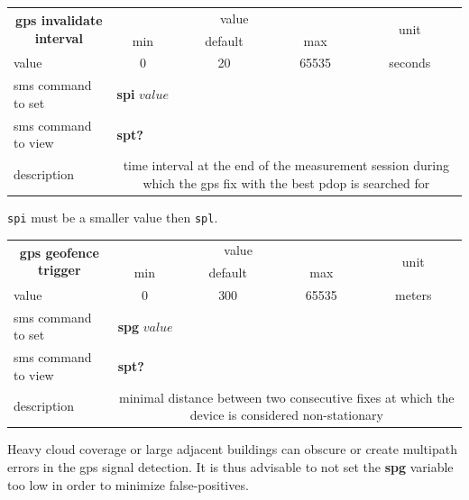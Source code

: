 \documentclass[a4paper,twoside]{refart}
\begin{document}
\label{sms:spi}
\begin{tabular}{ |l|c|c|c|c| }
    \hline
    \multicolumn{1}{|c|}{\multirow{2}{*}{\textbf{gps invalidate interval}}} & \multicolumn{3}{|c|}{value} & \multicolumn{1}{|c|}{\multirow{2}{*}{unit}} \\ \cline{2-4}
    \multicolumn{1}{|c|}{} & min & default & max & \\ \hline
    value & 0 & 20 & 65535 & seconds \\ \hline
    sms command to set & \multicolumn{4}{|l|}{\textbf{spi} $value$} \\ \hline
    sms command to view & \multicolumn{4}{|l|}{\textbf{spt?}} \\ \hline
    description & \multicolumn{4}{|p{6.8cm}|}{time interval at the end of the measurement session during which the gps fix with the best \gls{pdop} is searched for} \\ \hline
\end{tabular}

\verb"spi" must be a smaller value then \verb"spl".

\label{sms:spg}
\begin{tabular}{ |l|c|c|c|c| }
    \hline
    \multicolumn{1}{|c|}{\multirow{2}{*}{\textbf{gps geofence trigger}}} & \multicolumn{3}{|c|}{value} & \multicolumn{1}{|c|}{\multirow{2}{*}{unit}} \\ \cline{2-4}
    \multicolumn{1}{|c|}{} & min & default & max & \\ \hline
    value & 0 & 300 & 65535 & meters \\ \hline
    sms command to set & \multicolumn{4}{|l|}{\textbf{spg} $value$} \\ \hline
    sms command to view & \multicolumn{4}{|l|}{\textbf{spt?}} \\ \hline
    description & \multicolumn{4}{|p{7cm}|}{minimal distance between two consecutive fixes at which the device is considered non-stationary} \\ \hline
\end{tabular}

Heavy cloud coverage or large adjacent buildings can obscure or create multipath errors in the gps signal detection. It is thus advisable to not set the \textbf{spg} variable too low in order to minimize false-positives.
\end{document}
